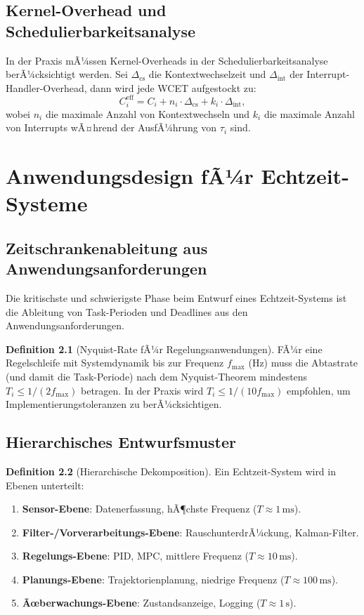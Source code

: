 ﻿\documentclass[a4paper,12pt]{report}
\theoremstyle{definition}
\newtheorem{definition}{Definition}[chapter]
\begin{document}
\section{Kernel-Overhead und Schedulierbarkeitsanalyse}

In der Praxis mÃ¼ssen Kernel-Overheads in der Schedulierbarkeitsanalyse berÃ¼cksichtigt
werden. Sei $\Delta_{\text{cs}}$ die Kontextwechselzeit und $\Delta_{\text{int}}$ der
Interrupt-Handler-Overhead, dann wird jede WCET aufgestockt zu:
\[
	C_i^{\text{eff}} = C_i + n_i \cdot \Delta_{\text{cs}} + k_i \cdot \Delta_{\text{int}},
\]
wobei $n_i$ die maximale Anzahl von Kontextwechseln und $k_i$ die maximale
Anzahl von Interrupts wÃ¤hrend der AusfÃ¼hrung von $\tau_i$ sind.

\chapter{Anwendungsdesign fÃ¼r Echtzeit-Systeme}
\label{chap:anwendung}

\section{Zeitschrankenableitung aus Anwendungsanforderungen}

Die kritischste und schwierigste Phase beim Entwurf eines Echtzeit-Systems
ist die Ableitung von Task-Perioden und Deadlines aus den Anwendungsanforderungen.

\begin{definition}[Nyquist-Rate fÃ¼r Regelungsanwendungen]
	FÃ¼r eine Regelschleife mit Systemdynamik bis zur Frequenz $f_{\max}$ (Hz) muss
	die Abtastrate (und damit die Task-Periode) nach dem Nyquist-Theorem mindestens
	$T_i \leq 1/(2 f_{\max})$ betragen. In der Praxis wird $T_i \leq 1/(10 f_{\max})$
	empfohlen, um Implementierungstoleranzen zu berÃ¼cksichtigen.
\end{definition}

\section{Hierarchisches Entwurfsmuster}

\begin{definition}[Hierarchische Dekomposition]
	Ein Echtzeit-System wird in Ebenen unterteilt:
	\begin{enumerate}
		\item \textbf{Sensor-Ebene}: Datenerfassung, hÃ¶chste Frequenz ($T \approx 1\,\text{ms}$).
		\item \textbf{Filter-/Vorverarbeitungs-Ebene}: RauschunterdrÃ¼ckung, Kalman-Filter.
		\item \textbf{Regelungs-Ebene}: PID, MPC, mittlere Frequenz ($T \approx 10\,\text{ms}$).
		\item \textbf{Planungs-Ebene}: Trajektorienplanung, niedrige Frequenz ($T \approx 100\,\text{ms}$).
		\item \textbf{Ãœberwachungs-Ebene}: Zustandsanzeige, Logging ($T \approx 1\,\text{s}$).
	\end{enumerate}
\end{definition}
\end{document}
